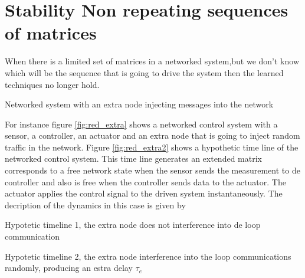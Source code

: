 \documentclass[nols]{tufte-handout}
\theoremstyle{definition}
\newcommand{\chapter}[1]{\section{#1}}
\begin{document}
\chapter{Stability Non repeating sequences of matrices}

When there is a limited set of matrices in a networked system,but we don't know which will be the sequence that is going to drive the system then the learned techniques no longer hold.
\begin{marginfigure}
    \centering
    
    \caption{Networked system with an extra node injecting messages into the network}
    \label{fig:red_extra}
\end{marginfigure}
For instance figure \ref{fig:red_extra} shows a networked control system with a sensor, a controller, an actuator and an extra node that is going to inject random traffic in the network. Figure \ref{fig:red_extra2} shows a hypothetic time line of the networked control system. This time line generates an extended matrix corresponds to a free network state when the sensor sends the measurement to de controller and also is free when the controller sends data to the actuator. The actuator applies the control signal to the driven system instantaneously. The decription of the dynamics in this case is given by

\begin{marginfigure}
    \centering
    
    \caption{Hypotetic timeline 1, the extra node does not interference into de loop communication}
    \label{fig:red_extra2}
\end{marginfigure}
\begin{marginfigure}
    \centering
    
    \caption{Hypotetic timeline 2, the extra node interference into the loop communications randomly, producing an estra delay $\tau_e$}
    \label{fig:red_extra3}
\end{marginfigure}
\end{document}
